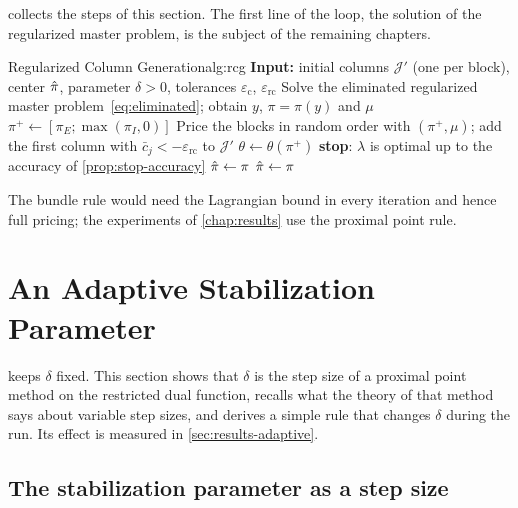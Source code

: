  collects the steps of this section. The first line of the loop, the solution
of the regularized master problem, is the subject of the remaining chapters.

\begin{algobox}{Regularized Column Generation}{alg:rcg}
\State \textbf{Input:} initial columns $\mathcal{J}'$ (one per block), center $\hat{\pi}$,
       parameter $\delta>0$, tolerances $\varepsilon_{\mathrm{c}}$, $\varepsilon_{\mathrm{rc}}$
\Repeat
    \State Solve the eliminated regularized master problem~\eqref{eq:eliminated}; obtain $y$,
           $\pi = \pi(y)$ and $\mu$
    \State $\pi^+\gets[\pi_E;\max(\pi_I,0)]$
    \State Price the blocks in random order with $(\pi^+,\mu)$; add the first column with
           $\bar c_j < -\varepsilon_{\mathrm{rc}}$ to $\mathcal{J}'$
        \State $\theta\gets\theta(\pi^+)$ 
            \State \textbf{stop}: $\lambda$ is optimal up to the accuracy of \cref{prop:stop-accuracy}
        \EndIf
        \State $\hat{\pi}\gets\pi$ 
    \Else
        \State $\hat{\pi}\gets\pi$ 
    \EndIf
{}
\end{algobox}

The bundle rule would need the Lagrangian bound in every iteration and hence full pricing; the
experiments of \cref{chap:results} use the proximal point rule.


\section{An Adaptive Stabilization Parameter}
\label{sec:adaptive}

 keeps $\delta$ fixed. This section shows that $\delta$ is the step size of a
proximal point method on the restricted dual function, recalls what the theory of that method
says about variable step sizes, and derives a simple rule that changes $\delta$ during the
run. Its effect is measured in \cref{sec:results-adaptive}.

\subsection{The stabilization parameter as a step size}

